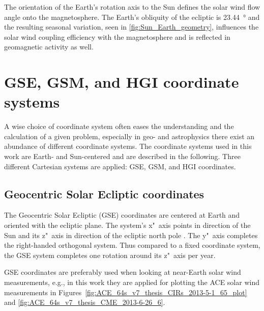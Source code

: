 The orientation of the Earth's rotation axis to the Sun defines the solar wind flow angle onto the magnetosphere. The Earth's obliquity of the ecliptic is \SI{23.44}{\degree} \citep{Luzum2011} and the resulting seasonal variation, seen in \autoref{fig:Sun_Earth_geometry}, influences the solar wind coupling efficiency with the magnetosphere and is reflected in geomagnetic activity as well.


\section{GSE, GSM, and HGI coordinate systems}
\label{sec:coordinate_systems}

A wise choice of coordinate system often eases the understanding and the calculation of a given problem, especially in geo- and astrophysics there exist an abundance of different coordinate systems. The coordinate systems used in this work are Earth- and Sun-centered and are described in the following. Three different Cartesian systems are applied: GSE, GSM, and HGI coordinates.

\subsection*{Geocentric Solar Ecliptic coordinates}
The Geocentric Solar Ecliptic (GSE) coordinates are centered at Earth and oriented with the ecliptic plane. The system's x"~axis points in direction of the Sun and its z"~axis in direction of the ecliptic north pole \citep{Russell1971,Hapgood1992}. The y"~axis completes the right-handed orthogonal system.
Thus compared to a fixed coordinate system, the GSE system completes one rotation around its z"~axis per year.

GSE coordinates are preferably used when looking at near-Earth solar wind measurements, e.g., in this work they are applied for plotting the ACE solar wind measurements in Figures~\ref{fig:ACE_64s_v7_thesis_CIRs_2013-5-1_65_plot} and \ref{fig:ACE_64s_v7_thesis_CME_2013-6-26_6}.

